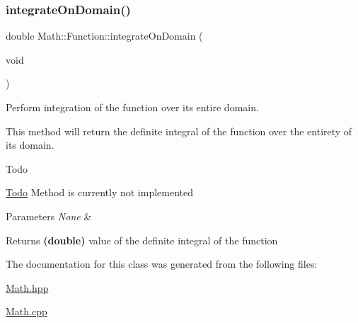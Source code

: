 \subsubsection{\texorpdfstring{integrate\+On\+Domain()}{integrateOnDomain()}}
{\footnotesize\ttfamily double Math\+::\+Function\+::integrate\+On\+Domain (\begin{DoxyParamCaption}\item[{void}]{ }\end{DoxyParamCaption})}



Perform integration of the function over its entire domain. 

This method will return the definite integral of the function over the entirety of its domain. \begin{DoxyRefDesc}{Todo}
\item[\mbox{\hyperlink{todo__todo000005}{Todo}}]Method is currently not implemented \end{DoxyRefDesc}

\begin{DoxyParams}{Parameters}
{\em None} & \\
\hline
\end{DoxyParams}
\begin{DoxyReturn}{Returns}
{\bfseries (double)} value of the definite integral of the function 
\end{DoxyReturn}


The documentation for this class was generated from the following files\+:\begin{DoxyCompactItemize}
\item 
\mbox{\hyperlink{_math_8hpp}{Math.\+hpp}}\item 
\mbox{\hyperlink{_math_8cpp}{Math.\+cpp}}\end{DoxyCompactItemize}
